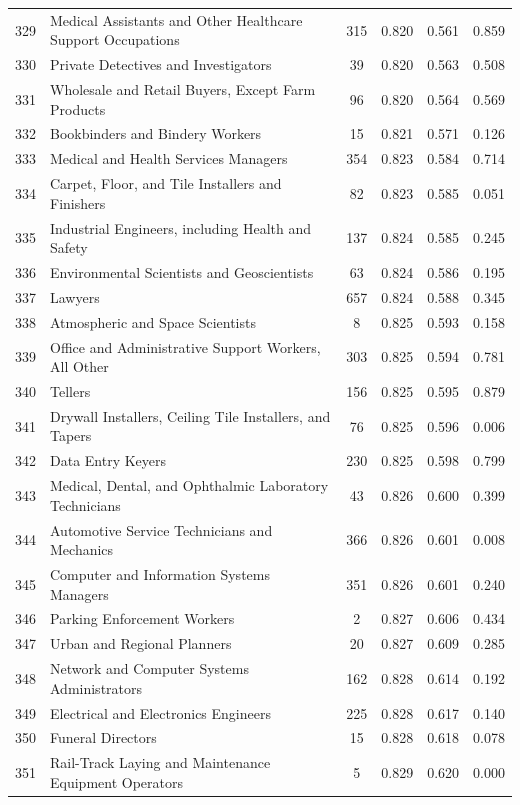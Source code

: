 {\begin{longtable}{llcccc}
 329 & Medical Assistants and Other Healthcare Support Occupations & 315 & 0.820 & 0.561 & 0.859 \\
 330 & Private Detectives and Investigators & 39 & 0.820 & 0.563 & 0.508 \\
 331 & Wholesale and Retail Buyers, Except Farm Products & 96 & 0.820 & 0.564 & 0.569 \\
 332 & Bookbinders and Bindery Workers & 15 & 0.821 & 0.571 & 0.126 \\
 333 & Medical and Health Services Managers & 354 & 0.823 & 0.584 & 0.714 \\
 334 & Carpet, Floor, and Tile Installers and Finishers & 82 & 0.823 & 0.585 & 0.051 \\
 335 & Industrial Engineers, including Health and Safety  & 137 & 0.824 & 0.585 & 0.245 \\
 336 & Environmental Scientists and Geoscientists & 63 & 0.824 & 0.586 & 0.195 \\
 337 & Lawyers & 657 & 0.824 & 0.588 & 0.345 \\
 338 & Atmospheric and Space Scientists & 8 & 0.825 & 0.593 & 0.158 \\
 339 & Office and Administrative Support Workers, All Other & 303 & 0.825 & 0.594 & 0.781 \\
 340 & Tellers & 156 & 0.825 & 0.595 & 0.879 \\
 341 & Drywall Installers, Ceiling Tile Installers, and Tapers & 76 & 0.825 & 0.596 & 0.006 \\
 342 & Data Entry Keyers & 230 & 0.825 & 0.598 & 0.799 \\
 343 & Medical, Dental, and Ophthalmic Laboratory Technicians & 43 & 0.826 & 0.600 & 0.399 \\
 344 & Automotive Service Technicians and Mechanics & 366 & 0.826 & 0.601 & 0.008 \\
 345 & Computer and Information Systems Managers & 351 & 0.826 & 0.601 & 0.240 \\
 346 & Parking Enforcement Workers & 2 & 0.827 & 0.606 & 0.434 \\
 347 & Urban and Regional Planners & 20 & 0.827 & 0.609 & 0.285 \\
 348 & Network and Computer Systems Administrators & 162 & 0.828 & 0.614 & 0.192 \\
 349 & Electrical and Electronics Engineers & 225 & 0.828 & 0.617 & 0.140 \\
 350 & Funeral Directors  & 15 & 0.828 & 0.618 & 0.078 \\
 351 & Rail-Track Laying and Maintenance Equipment Operators & 5 & 0.829 & 0.620 & 0.000 \\

\end{longtable}}
